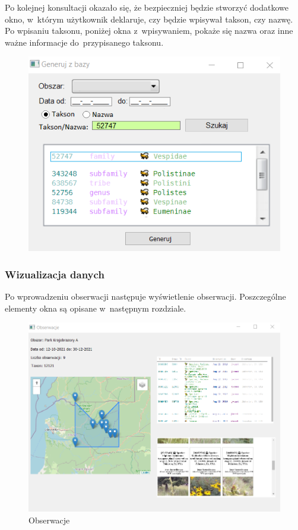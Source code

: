 \documentclass{article}
\begin{document}
\newpage
Po kolejnej konsultacji okazało się, że bezpieczniej będzie stworzyć dodatkowe okno, w~którym użytkownik deklaruje, czy będzie wpisywał takson, czy nazwę. Po wpisaniu taksonu, poniżej okna z~wpisywaniem, pokaże się nazwa oraz inne ważne informacje do~przypisanego taksonu.

\begin{figure}[h] 
\begin{center}
\includegraphics[scale = 1]{"gzb6.png"}
\end{center}
\label{}
\end{figure}

\newpage
\subsubsection{Wizualizacja danych}
Po wprowadzeniu obserwacji następuje wyświetlenie obserwacji. Poszczególne elementy okna są opisane w~następnym rozdziale.

\begin{figure}[h] 
\begin{center}
\includegraphics[scale = 1]{"obserwacje.png"}
\end{center}
\caption{Obserwacje}
\label{}
\end{figure}
\end{document}
